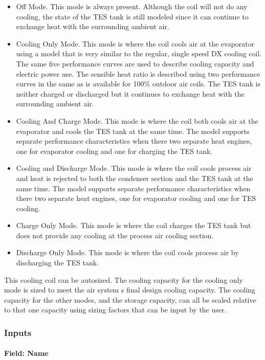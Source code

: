 \begin{itemize}
\item
  Off Mode. This mode is always present. Although the coil will not do any cooling, the state of the TES tank is still modeled since it can continue to exchange heat with the surrounding ambient air.
\item
  Cooling Only Mode. This mode is where the coil cools air at the evaporator using a model that is very similar to the regular, single speed DX cooling coil. The same five performance curves are used to describe cooling capacity and electric power use. The sensible heat ratio is described using two performance curves in the same as is available for 100\% outdoor air coils. The TES tank is neither charged or discharged but it continues to exchange heat with the surrounding ambient air.
\item
  Cooling And Charge Mode. This mode is where the coil both cools air at the evaporator and cools the TES tank at the same time. The model supports separate performance characteristics when there two separate heat engines, one for evaporator cooling and one for charging the TES tank.
\item
  Cooling and Discharge Mode. This mode is where the coil cools process air and heat is rejected to both the condenser section and the TES tank at the same time. The model supports separate performance characteristics when there two separate heat engines, one for evaporator cooling and one for TES cooling.
\item
  Charge Only Mode. This mode is where the coil charges the TES tank but does not provide any cooling at the process air cooling section.
\item
  Discharge Only Mode. This mode is where the coil cools process air by discharging the TES tank.
\end{itemize}

This cooling coil can be autosized. The cooling capacity for the cooling only mode is sized to meet the air system s final design cooling capacity. The cooling capacity for the other modes, and the storage capacity, can all be scaled relative to that one capacity using sizing factors that can be input by the user.

\subsubsection{Inputs}\label{inputs-35}

\paragraph{Field: Name}\label{field-name-34}

